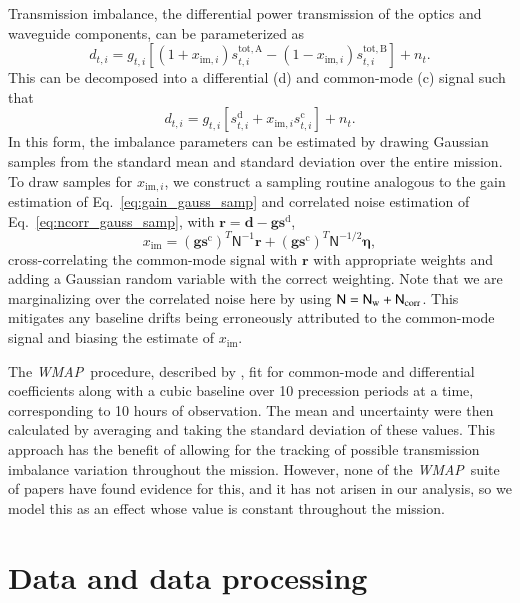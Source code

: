 \documentclass[twocolumn]{../../common/aa}
\def\WMAP{\emph{WMAP}}
\newcommand{\N}[0]{\tens{N}}
\begin{document}
Transmission imbalance, the differential power transmission of the optics and waveguide components, can be parameterized as
\begin{equation}
	d_{t,i}=g_{t,i}[(1+x_{\mathrm{im},i})s_{t,i}^\mathrm{tot,A}-(1-x_{\mathrm{im},i})s_{t,i}^\mathrm{tot,B}]+n_t.
\end{equation}
This can be decomposed into a differential (d) and common-mode (c) signal such that
\begin{equation}
	d_{t,i}=g_{t,i}[s_{t,i}^\mathrm d+x_{\mathrm{im},i}s_{t,i}^\mathrm c]+n_t.
\end{equation}
In this form, the imbalance parameters can be estimated by drawing Gaussian samples from the standard mean and standard deviation over the entire mission. To draw samples for $x_{\mathrm{im},i}$, we construct a sampling routine analogous to the gain estimation of Eq.~\eqref{eq:gain_gauss_samp} and correlated noise estimation of  Eq.~\eqref{eq:ncorr_gauss_samp}, with $\boldsymbol r=\boldsymbol d-\boldsymbol g\boldsymbol s^\mathrm d$,
\begin{equation}
	[(\boldsymbol g\boldsymbol s^\mathrm c)^T\mathsf N^{-1}\boldsymbol g\boldsymbol s^\mathrm c]x_\mathrm{im}
	=(\boldsymbol g\boldsymbol s^\mathrm c)^T\mathsf N^{-1}\boldsymbol r+(\boldsymbol g\boldsymbol s^\mathrm c)^T\mathsf N^{-1/2}\boldsymbol\eta,
\end{equation}
cross-correlating the common-mode signal with $\boldsymbol r$ with appropriate weights and adding a Gaussian random variable with the correct weighting. Note that we are marginalizing over the correlated noise here by using $\N=\N_\mathrm{w}+\N_\mathrm{corr}$. This mitigates any baseline drifts being erroneously attributed to the common-mode signal and biasing the estimate of $x_\mathrm{im}$.

The \WMAP\ procedure, described by \citet{jarosik2003a}, fit for common-mode and differential coefficients along with a cubic baseline over 10 precession periods at a time, corresponding to 10 hours of observation. The mean and uncertainty were then calculated by averaging and taking the standard deviation of these values. This approach has the benefit of allowing for the tracking of possible transmission imbalance variation throughout the mission. However, none of the \WMAP\ suite of papers have found evidence for this, and it has not arisen in our analysis, so we model this as an effect whose value is constant throughout the mission.

\section{Data and data processing}
\label{sec:data}
\end{document}
